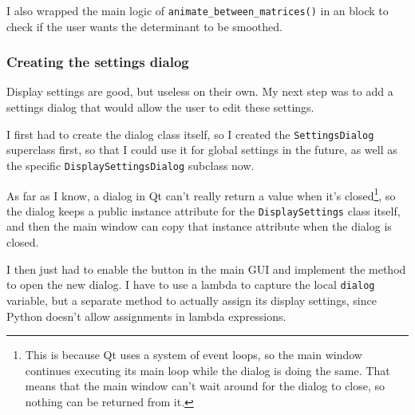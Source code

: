 \documentclass[../development.tex]{subfiles}
\begin{document}
I also wrapped the main logic of \texttt{animate_between_matrices()} in an  block to check if the user wants the determinant to be smoothed.


\subsubsection{Creating the settings dialog\label{development:adding-display-settings:creating-the-settings-dialog}}

Display settings are good, but useless on their own. My next step was to add a settings dialog that would allow the user to edit these settings.

I first had to create the dialog class itself, so I created the \texttt{SettingsDialog} superclass first, so that I could use it for global settings in the future, as well as the specific \texttt{DisplaySettingsDialog} subclass now.

As far as I know, a dialog in Qt can't really return a value when it's closed\footnote{This is because Qt uses a system of event loops, so the main window continues executing its main loop while the dialog is doing the same. That means that the main window can't wait around for the dialog to close, so nothing can be returned from it.}, so the dialog keeps a public instance attribute for the \texttt{DisplaySettings} class itself, and then the main window can copy that instance attribute when the dialog is closed.


I then just had to enable the button in the main GUI and implement the method to open the new dialog. I have to use a lambda to capture the local \texttt{dialog} variable, but a separate method to actually assign its display settings, since Python doesn't allow assignments in lambda expressions.


\end{document}
